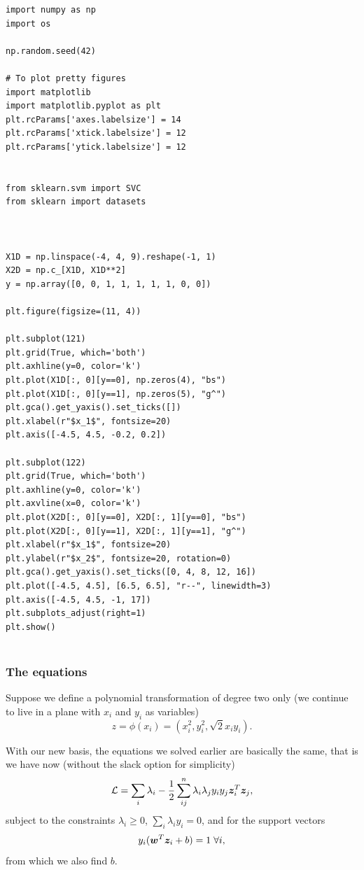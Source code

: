 \documentclass{beamer}
\begin{document}
\begin{frame}
\begin{lstlisting}
import numpy as np
import os

np.random.seed(42)

# To plot pretty figures
import matplotlib
import matplotlib.pyplot as plt
plt.rcParams['axes.labelsize'] = 14
plt.rcParams['xtick.labelsize'] = 12
plt.rcParams['ytick.labelsize'] = 12


from sklearn.svm import SVC
from sklearn import datasets



X1D = np.linspace(-4, 4, 9).reshape(-1, 1)
X2D = np.c_[X1D, X1D**2]
y = np.array([0, 0, 1, 1, 1, 1, 1, 0, 0])

plt.figure(figsize=(11, 4))

plt.subplot(121)
plt.grid(True, which='both')
plt.axhline(y=0, color='k')
plt.plot(X1D[:, 0][y==0], np.zeros(4), "bs")
plt.plot(X1D[:, 0][y==1], np.zeros(5), "g^")
plt.gca().get_yaxis().set_ticks([])
plt.xlabel(r"$x_1$", fontsize=20)
plt.axis([-4.5, 4.5, -0.2, 0.2])

plt.subplot(122)
plt.grid(True, which='both')
plt.axhline(y=0, color='k')
plt.axvline(x=0, color='k')
plt.plot(X2D[:, 0][y==0], X2D[:, 1][y==0], "bs")
plt.plot(X2D[:, 0][y==1], X2D[:, 1][y==1], "g^")
plt.xlabel(r"$x_1$", fontsize=20)
plt.ylabel(r"$x_2$", fontsize=20, rotation=0)
plt.gca().get_yaxis().set_ticks([0, 4, 8, 12, 16])
plt.plot([-4.5, 4.5], [6.5, 6.5], "r--", linewidth=3)
plt.axis([-4.5, 4.5, -1, 17])
plt.subplots_adjust(right=1)
plt.show()


\end{lstlisting}
\end{frame}

\begin{frame}
\frametitle{The equations}

Suppose we define a polynomial transformation of degree two only (we
continue to live in a plane with $x_i$ and $y_i$ as variables)
\[
z = \phi(x_i) =\left(x_i^2, y_i^2, \sqrt{2}x_iy_i\right).
\]

With our new basis, the equations we solved earlier are basically the same, that is we have now (without the slack option for simplicity)
\[
{\cal L}=\sum_i\lambda_i-\frac{1}{2}\sum_{ij}^n\lambda_i\lambda_jy_iy_j\bm{z}_i^T\bm{z}_j,
\]
subject to the constraints $\lambda_i\geq 0$, $\sum_i\lambda_iy_i=0$, and for the support vectors
\[
y_i(\bm{w}^T\bm{z}_i+b)= 1 \hspace{0.1cm}\forall i,
\]
from which we also find $b$.
\end{frame}
\end{document}
